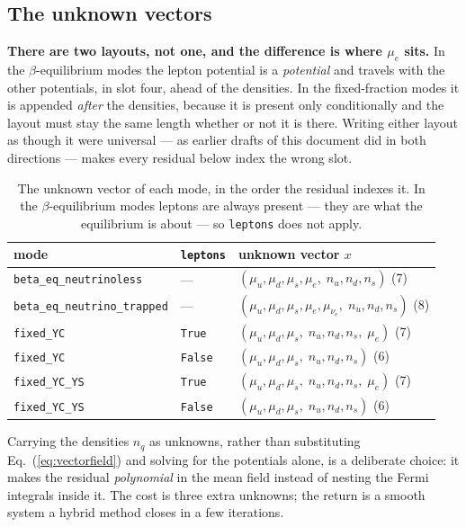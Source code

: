 \documentclass[aps,prc,onecolumn,superscriptaddress,nofootinbib,10pt]{revtex4-2}
\newcommand{\munue}{\mu_{\nu_e}}
\begin{document}
\subsection{The unknown vectors}
\label{sec:unknowns}

\textbf{There are two layouts, not one, and the difference is where $\mu_e$
sits.} In the $\beta$-equilibrium modes the lepton potential is a
\emph{potential} and travels with the other potentials, in slot four, ahead of
the densities. In the fixed-fraction modes it is appended \emph{after} the
densities, because it is present only conditionally and the layout must stay
the same length whether or not it is there. Writing either layout as though it
were universal --- as earlier drafts of this document did in both directions
--- makes every residual below index the wrong slot.

\begin{table}[h]
\centering
\begin{tabular}{lll}
\toprule
mode & \texttt{leptons} & unknown vector $x$ \\
\midrule
\texttt{beta\_eq\_neutrinoless}
  & --- & $(\mu_u, \mu_d, \mu_s, \mu_e,\; n_u, n_d, n_s)$ \hfill (7) \\
\texttt{beta\_eq\_neutrino\_trapped}
  & --- & $(\mu_u, \mu_d, \mu_s, \mu_e, \munue,\; n_u, n_d, n_s)$
          \hfill (8) \\
\texttt{fixed\_YC}
  & \texttt{True}  & $(\mu_u, \mu_d, \mu_s,\; n_u, n_d, n_s,\; \mu_e)$
                     \hfill (7) \\
\texttt{fixed\_YC}
  & \texttt{False} & $(\mu_u, \mu_d, \mu_s,\; n_u, n_d, n_s)$ \hfill (6) \\
\texttt{fixed\_YC\_YS}
  & \texttt{True}  & $(\mu_u, \mu_d, \mu_s,\; n_u, n_d, n_s,\; \mu_e)$
                     \hfill (7) \\
\texttt{fixed\_YC\_YS}
  & \texttt{False} & $(\mu_u, \mu_d, \mu_s,\; n_u, n_d, n_s)$ \hfill (6) \\
\bottomrule
\end{tabular}
\caption{The unknown vector of each mode, in the order the residual indexes
         it. In the $\beta$-equilibrium modes leptons are always present ---
         they are what the equilibrium is about --- so \texttt{leptons} does
         not apply.}
\label{tab:unknowns}
\end{table}

Carrying the densities $n_q$ as unknowns, rather than substituting
Eq.~(\ref{eq:vectorfield}) and solving for the potentials alone, is a
deliberate choice: it makes the residual \emph{polynomial} in the mean field
instead of nesting the Fermi integrals inside it. The cost is three extra
unknowns; the return is a smooth system a hybrid method closes in a few
iterations.
\end{document}
